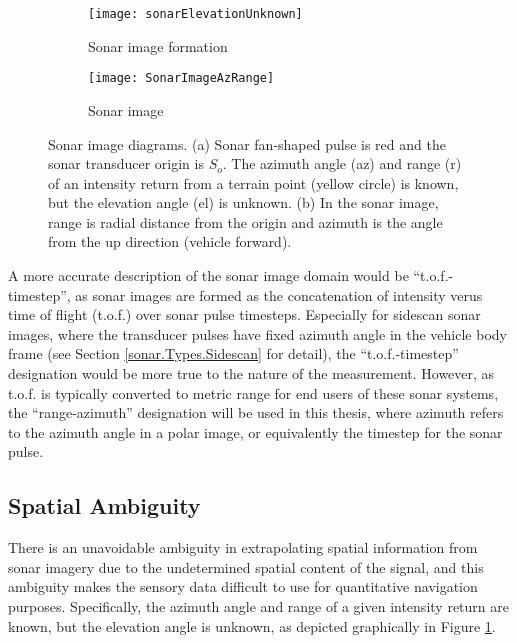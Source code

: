 \begin{figure}[!h]
	\centering
	\begin{subfigure}[b]{0.547\textwidth}
                \texttt{[image: sonarElevationUnknown]}
                \caption{Sonar image formation}
                \label{fig:sonarElevationUnknown2}
  	\end{subfigure}
  	\centering
	\begin{subfigure}[b]{0.443\textwidth}
                \texttt{[image: SonarImageAzRange]}
                \caption{Sonar image}
                \label{fig:sonarImageRAz2}
  	\end{subfigure}
	\caption{Sonar image diagrams. (a) Sonar fan-shaped pulse is red and the sonar transducer origin is $S_o$. The azimuth angle (az) and range (r) of an intensity return from a terrain point (yellow circle) is known, but the elevation angle (el) is unknown. (b) In the sonar image, range is radial distance from the origin and azimuth is the angle from the up direction (vehicle forward).}	
\end{figure}

A more accurate description of the sonar image domain would be ``t.o.f.-timestep'', as sonar images are formed as the concatenation of intensity verus time of flight (t.o.f.) over sonar pulse timesteps.
Especially for sidescan sonar images, where the transducer pulses have fixed azimuth angle in the vehicle body frame (see Section \ref{sonar.Types.Sidescan} for detail), the ``t.o.f.-timestep'' designation would be more true to the nature of the measurement.
However, as t.o.f. is typically converted to metric range for end users of these sonar systems, the ``range-azimuth'' designation will be used in this thesis, where azimuth refers to the azimuth angle in a polar image, or equivalently the timestep for the sonar pulse.

\subsection{Spatial Ambiguity}

There is an unavoidable ambiguity in extrapolating spatial information from sonar imagery due to the undetermined spatial content of the signal, and this ambiguity makes the sensory data difficult to use for quantitative navigation purposes.  
Specifically, the azimuth angle and range of a given intensity return are known, but the elevation angle is unknown, as depicted graphically in Figure \ref{fig:sonarElevationUnknown2}.

